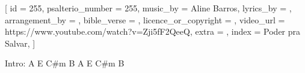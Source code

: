 [
    id                     = {255},
    psalterio_number       = {255},
    music_by               = {Aline Barros},
    lyrics_by              = {},
    arrangement_by         = {},
    bible_verse            = {},
    licence_or_copyright   = {},
    video_url              = {https://www.youtube.com/watch?v=Zji5fF2QeeQ},
    extra                  = {},
    index                  = {Poder pra Salvar},
]


\beginverse*
Intro: 
A E C#m B
A E C#m B
\endverse


\beginverse

